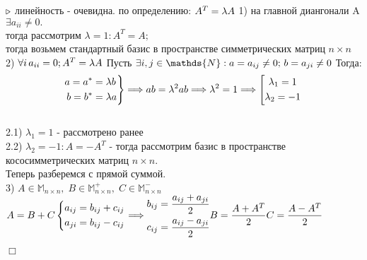 \documentclass[a4paper,12pt]{report}
\begin{document}
$\\ \triangleright$
линейность - очевидна.
по определению: $A^{T} = \lambda A\\ $
1) на главной диангонали A $\exists a_{ii} \neq 0. $
\\тогда рассмотрим $\lambda = 1: A^{T} = A; $
\\тогда возьмем стандартный базис в пространстве симметрических матриц $n \times n$ 
\\2) $\forall i \, a_{ii} = 0;\\ A^{T} = \lambda A\\$
Пусть $\exists i,j \in \mathds{N}: \\
a=a_{ij}\neq 0; \,b=  a_{ji}\neq 0\\$
Тогда:
\[
\left.
\begin{aligned}
a = a^{*} & =\lambda b\\
b = b^{*} & =\lambda a \\
\end{aligned}
\right\}
\Longrightarrow ab=\lambda^{2} ab \Longrightarrow \lambda^{2}=1 \Longrightarrow \left[ 
\begin{gathered} 
\lambda_{1} = 1
\\ \lambda_{2} = -1
\end{gathered}
\right.\\ \]
\\2.1) $\lambda_{1} = 1$ - рассмотрено ранее\\
2.2) $\lambda_{2} = -1 : A = -A^{T} $ - тогда рассмотрим базис в пространстве кососимметрических матриц $n \times n$.
\\Теперь разберемся с прямой суммой.\\
3)  $ A \in \mathds{M}_{n\times n}, \;  B \in \mathds{M}_{n\times n}^{+}, \; C \in \mathds{M}_{n\times n}^{-}$\\
$ A = B + C\\
\left\{ 
\begin{gathered} 
a_{ij} = b_{ij} + c_{ij}
\\a_{ji} = b_{ij} - c_{ij}
\end{gathered}
\right. \Longrightarrow \begin{gathered} 
b_{ij} = \frac{a_{ij} + a_{ji}}{2}
\\c_{ij} = \frac{a_{ij} - a_{ji}}{2}
\end{gathered}\\
B = \dfrac{A + A^{T}}{2}\\
C = \dfrac{A - A^{T}}{2}$\\
\begin{flushright}
	$\Box$
\end{flushright}
\end{document}

